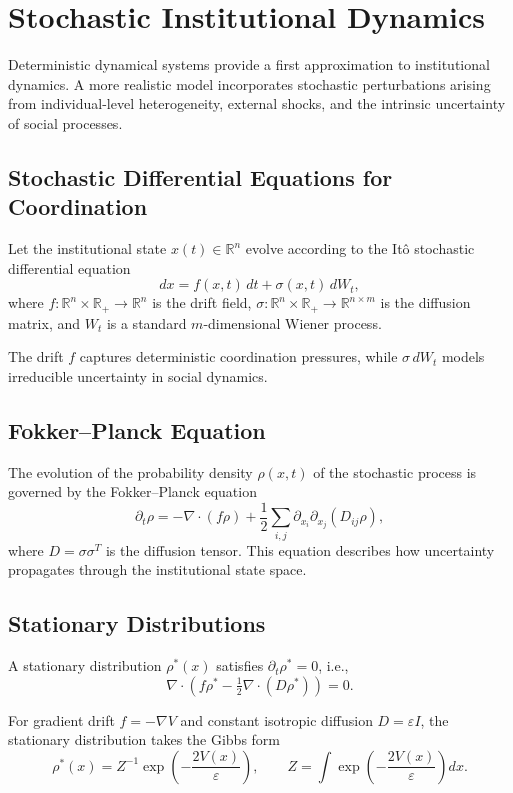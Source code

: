 \documentclass[12pt]{article}
\begin{document}
\section{Stochastic Institutional Dynamics}
\label{app:stochastic}

Deterministic dynamical systems provide a first approximation to institutional dynamics. A more realistic model incorporates stochastic perturbations arising from individual-level heterogeneity, external shocks, and the intrinsic uncertainty of social processes.

\subsection{Stochastic Differential Equations for Coordination}

Let the institutional state $x(t) \in \mathbb{R}^n$ evolve according to the It\^{o} stochastic differential equation
\[
dx = f(x,t)\,dt + \sigma(x,t)\,dW_t,
\]
where $f : \mathbb{R}^n \times \mathbb{R}_+ \to \mathbb{R}^n$ is the drift field, $\sigma : \mathbb{R}^n \times \mathbb{R}_+ \to \mathbb{R}^{n \times m}$ is the diffusion matrix, and $W_t$ is a standard $m$-dimensional Wiener process.

The drift $f$ captures deterministic coordination pressures, while $\sigma\,dW_t$ models irreducible uncertainty in social dynamics.

\subsection{Fokker--Planck Equation}

The evolution of the probability density $\rho(x,t)$ of the stochastic process is governed by the Fokker--Planck equation
\[
\partial_t \rho = -\nabla \cdot (f\rho) + \frac{1}{2}\sum_{i,j} \partial_{x_i}\partial_{x_j}(D_{ij}\rho),
\]
where $D = \sigma\sigma^T$ is the diffusion tensor. This equation describes how uncertainty propagates through the institutional state space.

\subsection{Stationary Distributions}

A stationary distribution $\rho^*(x)$ satisfies $\partial_t \rho^* = 0$, i.e.,
\[
\nabla \cdot \left(f\rho^* - \tfrac{1}{2}\nabla \cdot (D\rho^*)\right) = 0.
\]

For gradient drift $f = -\nabla V$ and constant isotropic diffusion $D = \varepsilon I$, the stationary distribution takes the Gibbs form
\[
\rho^*(x) = Z^{-1}\exp\!\left(-\frac{2V(x)}{\varepsilon}\right), \qquad Z = \int \exp\!\left(-\frac{2V(x)}{\varepsilon}\right)dx.
\]
\end{document}
